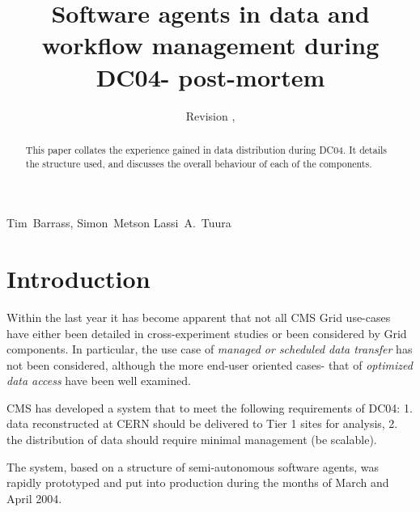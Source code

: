 \documentclass{cmspaper}
\begin{document}
\begin{titlepage}
  \date{Revision \RCSRevision, \RCSDate}
  \title{Software agents in data and workflow management during DC04- post-mortem}

  \begin{Authlist}
    Tim~Barrass, Simon~Metson
    Lassi~A.~Tuura
  \end{Authlist}


  \begin{abstract}
	This paper collates the experience gained in data distribution during
	DC04. It details the structure used, and discusses the overall behaviour
	of each of the components.
  \end{abstract} 

\end{titlepage}

\setcounter{page}{2}

\section{Introduction}
Within the last year it has become apparent that not all CMS Grid use-cases
have either been detailed in cross-experiment studies or been
considered by Grid components. In particular, the use case of
{\it managed or scheduled data transfer} has not been considered, although
the more end-user oriented cases- that of {\it optimized data access} have
been well examined.

CMS has developed a system that to meet the following requirements of DC04:
1. data reconstructed at CERN should be delivered to Tier 1 sites for
analysis, 2. the distribution of data should require minimal management (be
scalable).

The system, based on a structure of semi-autonomous software agents, was
rapidly prototyped and put into production during the months of March and
April 2004.
\end{document}

